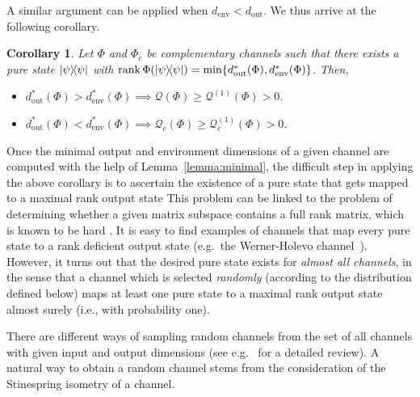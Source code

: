 \documentclass[a4paper,onecolumn,10pt,accepted=2022-07-11]{quantumarticle}
\newcommand{\env}{\operatorname{env}}
\newcommand{\out}{\operatorname{out}}
\newtheorem{corollary}[theorem]{Corollary}
\theoremstyle{definition}
\begin{document}
A similar argument can be applied when $d_{\env}<d_{\out}$. We thus arrive at the following corollary.

\begin{corollary}\label{corollary:vikesh} \cite[Section IV]{siddhu2020logsingularities}
\cite[Corollary II.8]{Singh2022detecting}
Let $\Phi$ and $\Phi_c$ be complementary channels such that there exists a pure state $\ketbra{\psi}$ with $\operatorname{rank}\Phi(\ketbra{\psi})= \min\{d^*_{\out}(\Phi),d^*_{\env}(\Phi)\}$. Then,
\begin{itemize}
    \item $d^{*}_{\out}(\Phi)>d^{*}_{\operatorname{env}}(\Phi)\implies \mathcal{Q}(\Phi)\geq\mathcal{Q}^{(1)}(\Phi)>0$.
    \item $d^{*}_{\out}(\Phi)<d^{*}_{\operatorname{env}}(\Phi)\implies\mathcal{Q}_c(\Phi)\geq\mathcal{Q}^{(1)}_c(\Phi)>0$.
    \end{itemize}
\end{corollary}

Once the minimal output and environment dimensions of a given channel are computed with the help of Lemma~\ref{lemma:minimal}, the difficult step in applying the above corollary is to ascertain the existence of a pure state that gets mapped to a maximal rank output state %
This problem can be linked to the problem of determining whether a given matrix subspace contains a full rank matrix, which is known to be hard \cite{Lovsz1989rank,Gurvits2003rank}. It is easy to find examples of channels that map every pure state to a rank deficient output state (e.g.~the Werner-Holevo channel~\cite{Werner-Holevo}). However, it turns out that the desired pure state exists for \emph{almost all channels}, in the sense that a channel which is selected \emph{randomly} (according to the distribution defined below) maps at least one pure state to a maximal rank output state almost surely (i.e., with probability one).  

There are different ways of sampling random channels from the set of all channels with given input and output dimensions (see e.g.~\cite{kukulski2021generating} for a detailed review). A natural way to obtain a random channel stems from the consideration of the Stinespring isometry of a channel.
\end{document}
